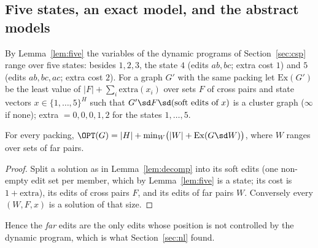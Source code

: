 \subsection{Five states, an exact model, and the abstract models}\label{sec:softmodel}
By Lemma~\ref{lem:five} the variables of the dynamic programs of Section~\ref{sec:csp} range over five states: besides $1,2,3$, the state $4$ (edits $ab,bc$; extra cost $1$) and $5$ (edits $ab,bc,ac$; extra cost $2$). For a graph $G'$ with the same packing let $\mathrm{Ex}(G')$ be the least value of $|F|+\sum_i\mathrm{extra}(x_i)$ over sets $F$ of cross pairs and state vectors $x\in\{1,\dots,5\}^H$ such that $G'\sd F\sd(\text{soft edits of }x)$ is a cluster graph ($\infty$ if none); extra $=0,0,0,1,2$ for the states $1,\dots,5$.
\begin{lemma}[Exactness]\label{lem:sfE}
For every packing, $\OPT(G)=|H|+\min_{W}\bigl(|W|+\mathrm{Ex}(G\sd W)\bigr)$, where $W$ ranges over sets of far pairs.
\end{lemma}
\begin{proof}
Split a solution as in Lemma~\ref{lem:decomp} into its soft edits (one non-empty edit set per member, which by Lemma~\ref{lem:five} is a state; its cost is $1+\mathrm{extra}$), its edits of cross pairs $F$, and its edits of far pairs $W$. Conversely every $(W,F,x)$ is a solution of that size.
\end{proof}
Hence the \emph{far} edits are the only edits whose position is not controlled by the dynamic program, which is what Section~\ref{sec:nl} found.

